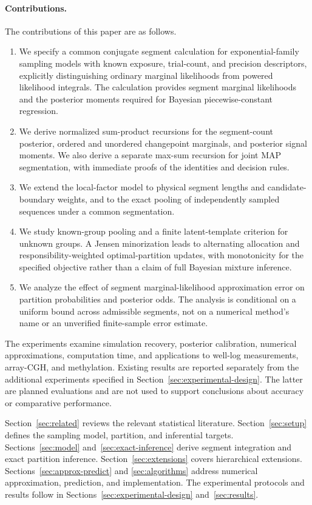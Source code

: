 \paragraph{Contributions.}
The contributions of this paper are as follows.
\begin{enumerate}
\item We specify a common conjugate segment calculation for exponential-family
  sampling models with known exposure, trial-count, and precision descriptors,
  explicitly distinguishing ordinary marginal likelihoods from powered
  likelihood integrals. The calculation provides segment marginal likelihoods
  and the posterior moments required for Bayesian piecewise-constant regression.
\item We derive normalized sum-product recursions for the segment-count
  posterior, ordered and unordered changepoint marginals, and posterior signal
  moments. We also derive a separate max-sum recursion for joint MAP
  segmentation, with immediate proofs of the identities and decision rules.
\item We extend the local-factor model to physical segment lengths and
  candidate-boundary weights, and to the exact pooling of independently sampled
  sequences under a common segmentation.
\item We study known-group pooling and a finite latent-template criterion for
  unknown groups. A Jensen minorization leads to alternating allocation and
  responsibility-weighted optimal-partition updates, with monotonicity for the
  specified objective rather than a claim of full Bayesian mixture inference.
\item We analyze the effect of segment marginal-likelihood approximation error
  on partition probabilities and posterior odds. The analysis is conditional
  on a uniform bound across admissible segments, not on a numerical method's
  name or an unverified finite-sample error estimate.
\end{enumerate}

The experiments examine simulation recovery, posterior calibration, numerical
approximations, computation time, and applications to well-log measurements,
array-CGH, and methylation. Existing results are reported
separately from the additional experiments specified in
Section~\ref{sec:experimental-design}. The latter are planned evaluations and
are not used to support conclusions about accuracy or comparative performance.

Section~\ref{sec:related} reviews the relevant statistical literature.
Section~\ref{sec:setup} defines the sampling model, partition, and inferential
targets. Sections~\ref{sec:model} and~\ref{sec:exact-inference} derive segment
integration and exact partition inference. Section~\ref{sec:extensions}
covers hierarchical extensions. Sections~\ref{sec:approx-predict} and
\ref{sec:algorithms} address numerical approximation, prediction, and
implementation. The experimental protocols and results follow in
Sections~\ref{sec:experimental-design} and~\ref{sec:results}.

